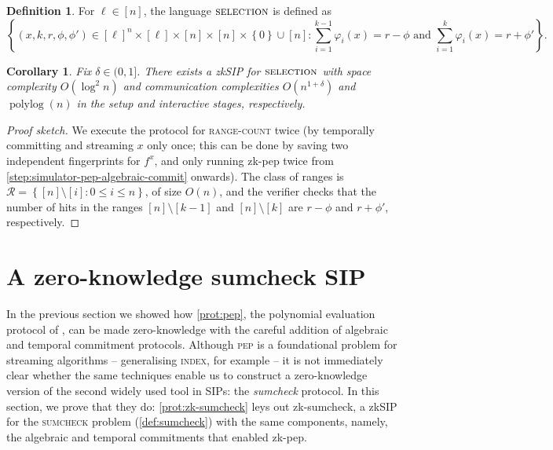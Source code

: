 \documentclass[10pt,a4paper]{article}
\newtheorem{corollary}[theorem]{Corollary}
\theoremstyle{definition}
\newtheorem{definition}[theorem]{Definition}
\newcommand{\zksip}{\textrm{zkSIP}}
\renewcommand{\set}[1]{\left\{#1\right\}}
\newcommand{\polylog}{\operatorname{polylog}}
\newcommand{\indexproblem}{\normalfont\textsc{index}\xspace}
\newcommand{\pep}{\normalfont\textsc{pep}\xspace}
\newcommand{\sumcheck}{\normalfont\textsc{sumcheck}\xspace}
\newcommand{\rangecount}{\normalfont\textsc{range-count}\xspace}
\newcommand{\selection}{\normalfont\textsc{selection}\xspace}
\begin{document}
\begin{definition}
  \label{def:selection}
  For $\ell \in [n]$, the language $\selection$ is defined as
  \begin{equation*}
      \set{(x, k, r, \phi, \phi') \in [\ell]^n \times [\ell] \times [n] \times [n] \times \set{0} \cup [n] : \sum_{i = 1}^{k-1} \varphi_i(x) = r - \phi \text{ and } \sum_{i = 1}^k \varphi_i(x) = r + \phi'}.
  \end{equation*}
\end{definition}
\begin{corollary}
    \label{cor:selection}
    Fix $\delta \in (0,1]$. There exists a \zksip{} for $\selection$ with space complexity $O(\log^2 n)$ and communication complexities $O(n^{1 + \delta})$ and $\polylog(n)$ in the setup and interactive stages, respectively.
\end{corollary}
\begin{proof}[Proof sketch]
    We execute the protocol for \rangecount twice (by temporally committing and streaming $x$ only once; this can be done by saving two independent fingerprints for $f^x$, and only running \textsf{zk-pep} twice from \cref{step:simulator-pep-algebraic-commit} onwards). The class of ranges is $\mathcal{R} = \set{[n] \setminus [i] : 0 \leq i \leq n}$, of size $O(n)$, and the verifier checks that the number of hits in the ranges $[n] \setminus [k - 1]$ and $[n] \setminus [k]$ are $r - \phi$ and $r + \phi'$, respectively.
\end{proof}

\section{A zero-knowledge sumcheck SIP}
\label{sec:sumcheck}

In the previous section we showed how \cref{prot:pep}, the polynomial evaluation protocol of \cite{CTY11}, can be made zero-knowledge with the careful addition of algebraic and temporal commitment protocols. Although \pep is a foundational problem for streaming algorithms -- generalising \indexproblem, for example -- it is not immediately clear whether the same techniques enable us to construct a zero-knowledge version of the second widely used tool in SIPs: the \emph{sumcheck} protocol. In this section, we prove that they do: \cref{prot:zk-sumcheck} leys out \textsf{zk-sumcheck}, a \zksip{} for the \sumcheck problem (\cref{def:sumcheck}) with the same components, namely, the algebraic and temporal commitments that enabled \textsf{zk-pep}.
\end{document}
